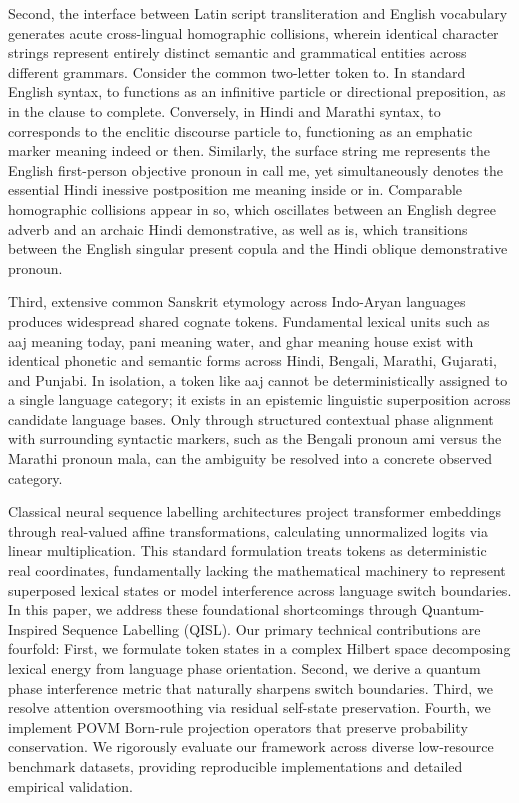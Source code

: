 \documentclass[10pt,twocolumn,letterpaper]{article}
\theoremstyle{definition}
\begin{document}
Second, the interface between Latin script transliteration and English vocabulary generates acute cross-lingual homographic collisions, wherein identical character strings represent entirely distinct semantic and grammatical entities across different grammars. Consider the common two-letter token to. In standard English syntax, to functions as an infinitive particle or directional preposition, as in the clause to complete. Conversely, in Hindi and Marathi syntax, to corresponds to the enclitic discourse particle to, functioning as an emphatic marker meaning indeed or then. Similarly, the surface string me represents the English first-person objective pronoun in call me, yet simultaneously denotes the essential Hindi inessive postposition me meaning inside or in. Comparable homographic collisions appear in so, which oscillates between an English degree adverb and an archaic Hindi demonstrative, as well as is, which transitions between the English singular present copula and the Hindi oblique demonstrative pronoun.

Third, extensive common Sanskrit etymology across Indo-Aryan languages produces widespread shared cognate tokens. Fundamental lexical units such as aaj meaning today, pani meaning water, and ghar meaning house exist with identical phonetic and semantic forms across Hindi, Bengali, Marathi, Gujarati, and Punjabi. In isolation, a token like aaj cannot be deterministically assigned to a single language category; it exists in an epistemic linguistic superposition across candidate language bases. Only through structured contextual phase alignment with surrounding syntactic markers, such as the Bengali pronoun ami versus the Marathi pronoun mala, can the ambiguity be resolved into a concrete observed category.

Classical neural sequence labelling architectures project transformer embeddings through real-valued affine transformations, calculating unnormalized logits via linear multiplication. This standard formulation treats tokens as deterministic real coordinates, fundamentally lacking the mathematical machinery to represent superposed lexical states or model interference across language switch boundaries. In this paper, we address these foundational shortcomings through Quantum-Inspired Sequence Labelling (QISL). Our primary technical contributions are fourfold: First, we formulate token states in a complex Hilbert space decomposing lexical energy from language phase orientation. Second, we derive a quantum phase interference metric that naturally sharpens switch boundaries. Third, we resolve attention oversmoothing via residual self-state preservation. Fourth, we implement POVM Born-rule projection operators that preserve probability conservation. We rigorously evaluate our framework across diverse low-resource benchmark datasets, providing reproducible implementations and detailed empirical validation.
\end{document}
